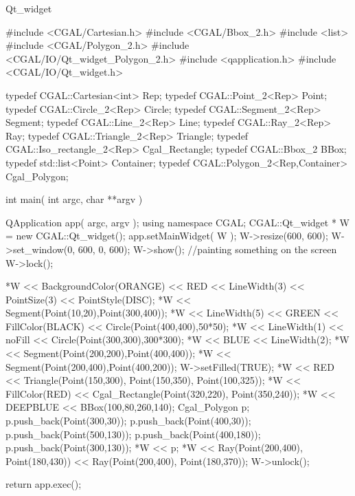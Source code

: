 \begin{ccRefClass}{Qt_widget}
\begin{ccExampleCode}
#include <CGAL/Cartesian.h>
#include <CGAL/Bbox_2.h>
#include <list>
#include <CGAL/Polygon_2.h>
#include <CGAL/IO/Qt_widget_Polygon_2.h>
#include <qapplication.h>
#include <CGAL/IO/Qt_widget.h>

typedef CGAL::Cartesian<int>   Rep;
typedef CGAL::Point_2<Rep>     Point;
typedef CGAL::Circle_2<Rep>    Circle;
typedef CGAL::Segment_2<Rep>   Segment;
typedef CGAL::Line_2<Rep>      Line;
typedef CGAL::Ray_2<Rep>       Ray;
typedef CGAL::Triangle_2<Rep>  Triangle;
typedef CGAL::Iso_rectangle_2<Rep>
                               Cgal_Rectangle;
typedef CGAL::Bbox_2           BBox;
typedef std::list<Point>       Container;
typedef CGAL::Polygon_2<Rep,Container>
                               Cgal_Polygon;

int main( int argc, char **argv )
{
  QApplication app( argc, argv );
  using namespace CGAL;
  CGAL::Qt_widget * W = new CGAL::Qt_widget();
  app.setMainWidget( W );
  W->resize(600, 600);
  W->set_window(0, 600, 0, 600);
  W->show();
  //painting something on the screen
  W->lock();

  *W << BackgroundColor(ORANGE) << RED <<
  LineWidth(3) << PointSize(3) << PointStyle(DISC);
  *W << Segment(Point(10,20),Point(300,400));
  *W << LineWidth(5) << GREEN << FillColor(BLACK) <<
    Circle(Point(400,400),50*50);
  *W << LineWidth(1) << noFill << Circle(Point(300,300),300*300);
  *W << BLUE << LineWidth(2);
  *W << Segment(Point(200,200),Point(400,400));
  *W << Segment(Point(200,400),Point(400,200));
  W->setFilled(TRUE);
  *W << RED << Triangle(Point(150,300),
				  Point(150,350),
				  Point(100,325));
  *W << FillColor(RED) << Cgal_Rectangle(Point(320,220),
					      Point(350,240));
  *W << DEEPBLUE << BBox(100,80,260,140);
  Cgal_Polygon p;
  p.push_back(Point(300,30));
  p.push_back(Point(400,30));
  p.push_back(Point(500,130));
  p.push_back(Point(400,180));
  p.push_back(Point(300,130));
  *W << p;
  *W << Ray(Point(200,400), Point(180,430))
    << Ray(Point(200,400), Point(180,370));
  W->unlock();

  return app.exec();
}
\end{ccExampleCode}

\end{ccRefClass}








